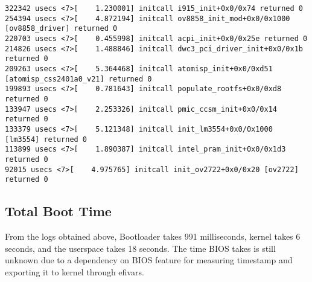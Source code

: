 \begin{Verbatim}[fontsize=\small]
322342 usecs <7>[    1.230001] initcall i915_init+0x0/0x74 returned 0
254394 usecs <7>[    4.872194] initcall ov8858_init_mod+0x0/0x1000 [ov8858_driver] returned 0
220703 usecs <7>[    0.455998] initcall acpi_init+0x0/0x25e returned 0
214826 usecs <7>[    1.488846] initcall dwc3_pci_driver_init+0x0/0x1b returned 0
209263 usecs <7>[    5.364468] initcall atomisp_init+0x0/0xd51 [atomisp_css2401a0_v21] returned 0
199893 usecs <7>[    0.781643] initcall populate_rootfs+0x0/0xd8 returned 0
133947 usecs <7>[    2.253326] initcall pmic_ccsm_init+0x0/0x14 returned 0
133379 usecs <7>[    5.121348] initcall init_lm3554+0x0/0x1000 [lm3554] returned 0
113899 usecs <7>[    1.890387] initcall intel_pram_init+0x0/0x1d3 returned 0
92015 usecs <7>[    4.975765] initcall init_ov2722+0x0/0x20 [ov2722] returned 0
\end{Verbatim}

\subsection{Total Boot Time}

From the logs obtained above, Bootloader takes 991 milliseconds,
kernel takes 6 seconds, and the userspace takes 18 seconds. The time
BIOS takes is still unknown due to a dependency on BIOS feature for
measuring timestamp and exporting it to kernel through efivars.

